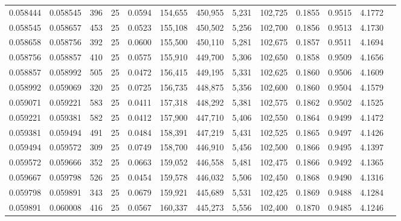 \begin{tabular}{rrrrrrrrrrrrr}
0.058444 & 0.058545 &   396 &  25 &                                     0.0594 & 154,655 & 450,955 &   5,231 & 102,725 & 0.1855 & 0.9515 & 4.1772 \\
0.058545 & 0.058657 &   453 &  25 &                                     0.0523 & 155,108 & 450,502 &   5,256 & 102,700 & 0.1856 & 0.9513 & 4.1730 \\
0.058658 & 0.058756 &   392 &  25 &                                     0.0600 & 155,500 & 450,110 &   5,281 & 102,675 & 0.1857 & 0.9511 & 4.1694 \\
0.058756 & 0.058857 &   410 &  25 &                                     0.0575 & 155,910 & 449,700 &   5,306 & 102,650 & 0.1858 & 0.9509 & 4.1656 \\
0.058857 & 0.058992 &   505 &  25 &                                     0.0472 & 156,415 & 449,195 &   5,331 & 102,625 & 0.1860 & 0.9506 & 4.1609 \\
0.058992 & 0.059069 &   320 &  25 &                                     0.0725 & 156,735 & 448,875 &   5,356 & 102,600 & 0.1860 & 0.9504 & 4.1579 \\
0.059071 & 0.059221 &   583 &  25 &                                     0.0411 & 157,318 & 448,292 &   5,381 & 102,575 & 0.1862 & 0.9502 & 4.1525 \\
0.059221 & 0.059381 &   582 &  25 &                                     0.0412 & 157,900 & 447,710 &   5,406 & 102,550 & 0.1864 & 0.9499 & 4.1472 \\
0.059381 & 0.059494 &   491 &  25 &                                     0.0484 & 158,391 & 447,219 &   5,431 & 102,525 & 0.1865 & 0.9497 & 4.1426 \\
0.059494 & 0.059572 &   309 &  25 &                                     0.0749 & 158,700 & 446,910 &   5,456 & 102,500 & 0.1866 & 0.9495 & 4.1397 \\
0.059572 & 0.059666 &   352 &  25 &                                     0.0663 & 159,052 & 446,558 &   5,481 & 102,475 & 0.1866 & 0.9492 & 4.1365 \\
0.059667 & 0.059798 &   526 &  25 &                                     0.0454 & 159,578 & 446,032 &   5,506 & 102,450 & 0.1868 & 0.9490 & 4.1316 \\
0.059798 & 0.059891 &   343 &  25 &                                     0.0679 & 159,921 & 445,689 &   5,531 & 102,425 & 0.1869 & 0.9488 & 4.1284 \\
0.059891 & 0.060008 &   416 &  25 &                                     0.0567 & 160,337 & 445,273 &   5,556 & 102,400 & 0.1870 & 0.9485 & 4.1246 \\

\end{tabular}

